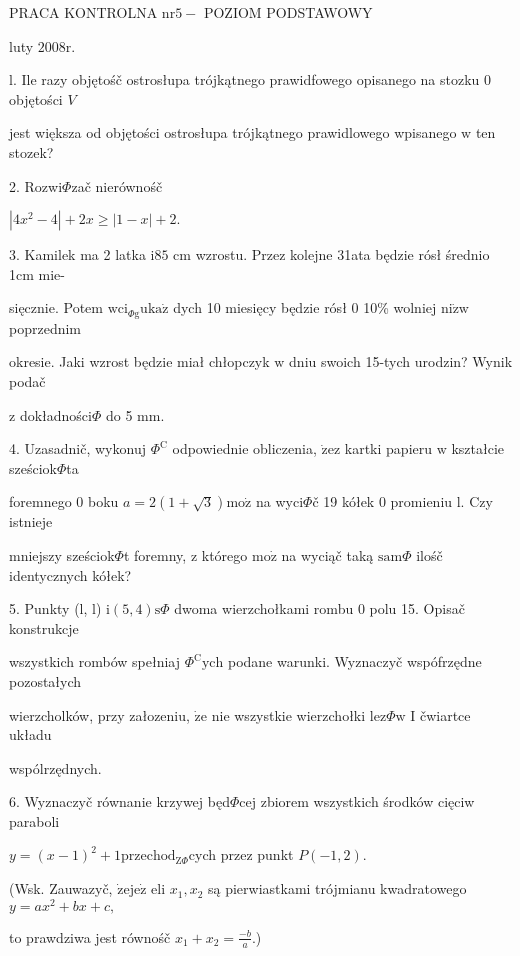 \documentclass[a4paper,12pt]{article}
\begin{document}
PRACA KONTROLNA $\mathrm{n}\mathrm{r}5-$ POZIOM PODSTAWOWY

luty $2008\mathrm{r}.$

l. Ile razy objętośč ostrosłupa trójkątnego prawidfowego opisanego na stozku $0$ objętości $V$

jest większa od objętości ostrosłupa trójkątnego prawidlowego wpisanego $\mathrm{w}$ ten stozek?

2. Rozwi$\Phi$zač nierównośč

$|4x^{2}-4|+2x\geq|1-x|+2.$

3. Kamilek ma 2 latka $\mathrm{i}85$ cm wzrostu. Przez kolejne 31ata będzie rósł średnio 1cm mie-

sięcznie. Potem $\mathrm{w}\mathrm{c}\mathrm{i}_{\Phi \mathrm{g}}\mathrm{u}\mathrm{k}\mathrm{a}\dot{\mathrm{z}}$ dych 10 miesięcy będzie rósł $0$ 10\% wolniej $\mathrm{n}\mathrm{i}\dot{\mathrm{z}}\mathrm{w}$ poprzednim

okresie. Jaki wzrost będzie miał chłopczyk $\mathrm{w}$ dniu swoich 15-tych urodzin? Wynik podač

$\mathrm{z}$ dokładności$\Phi$ do 5 mm.

4. Uzasadnič, wykonuj $\Phi^{\mathrm{C}}$ odpowiednie obliczenia, $\dot{\mathrm{z}}\mathrm{e}\mathrm{z}$ kartki papieru $\mathrm{w}$ kształcie sześciok$\Phi$ta

foremnego $0$ boku $a= 2(1+\sqrt{3}) \mathrm{m}\mathrm{o}\dot{\mathrm{z}}$ na wyci$\Phi$č 19 kółek $0$ promieniu l. Czy istnieje

mniejszy sześciok$\Phi$t foremny, $\mathrm{z}$ którego $\mathrm{m}\mathrm{o}\dot{\mathrm{z}}$ na wyciąč taką $\mathrm{s}\mathrm{a}\mathrm{m}\Phi$ ilośč identycznych kółek?

5. Punkty (l, l) $\mathrm{i} (5,4) \mathrm{s}\Phi$ dwoma wierzchołkami rombu $0$ polu 15. Opisač konstrukcje

wszystkich rombów spełniaj $\Phi^{\mathrm{C}}\mathrm{y}\mathrm{c}\mathrm{h}$ podane warunki. Wyznaczyč wspófrzędne pozostałych

wierzcholków, przy załozeniu, $\dot{\mathrm{z}}\mathrm{e}$ nie wszystkie wierzchołki $\mathrm{l}\mathrm{e}\mathrm{z}\Phi \mathrm{w}$ I čwiartce układu

wspólrzędnych.

6. Wyznaczyč równanie krzywej będ$\Phi$cej zbiorem wszystkich środków cięciw paraboli

$y=(x-1)^{2}+1 \mathrm{p}\mathrm{r}\mathrm{z}\mathrm{e}\mathrm{c}\mathrm{h}\mathrm{o}\mathrm{d}_{\mathrm{Z}\Phi}$cych przez punkt $P(-1,2).$

(Wsk. Zauwazyč, $\dot{\mathrm{z}}\mathrm{e}\mathrm{j}\mathrm{e}\dot{\mathrm{z}}$ eli $x_{1}, x_{2}$ są pierwiastkami trójmianu kwadratowego $y=ax^{2}+bx+c,$

to prawdziwa jest równośč $x_{1}+x_{2}=\displaystyle \frac{-b}{a}.$)
\end{document}
